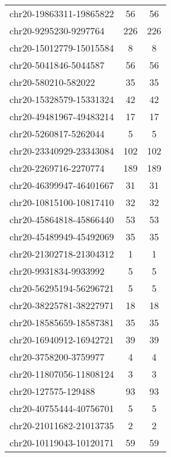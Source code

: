 \documentclass[10pt,letterpaper]{article}
\begin{document}
{\begin{longtable}{lSS}
	chr20-19863311-19865822 & 56     & 56                    \\
	chr20-9295230-9297764   & 226    & 226                   \\
	chr20-15012779-15015584 & 8      & 8                     \\
	chr20-5041846-5044587   & 56     & 56                    \\
	chr20-580210-582022     & 35     & 35                    \\
	chr20-15328579-15331324 & 42     & 42                    \\
	chr20-49481967-49483214 & 17     & 17                    \\
	chr20-5260817-5262044   & 5      & 5                     \\
	chr20-23340929-23343084 & 102    & 102                   \\
	chr20-2269716-2270774   & 189    & 189                   \\
	chr20-46399947-46401667 & 31     & 31                    \\
	chr20-10815100-10817410 & 32     & 32                    \\
	chr20-45864818-45866440 & 53     & 53                    \\
	chr20-45489949-45492069 & 35     & 35                    \\
	chr20-21302718-21304312 & 1      & 1                     \\
	chr20-9931834-9933992   & 5      & 5                     \\
	chr20-56295194-56296721 & 5      & 5                     \\
	chr20-38225781-38227971 & 18     & 18                    \\
	chr20-18585659-18587381 & 35     & 35                    \\
	chr20-16940912-16942721 & 39     & 39                    \\
	chr20-3758200-3759977   & 4      & 4                     \\
	chr20-11807056-11808124 & 3      & 3                     \\
	chr20-127575-129488     & 93     & 93                    \\
	chr20-40755444-40756701 & 5      & 5                     \\
	chr20-21011682-21013735 & 2      & 2                     \\
	chr20-10119043-10120171 & 59     & 59                    \\

\end{longtable}}
\end{document}
